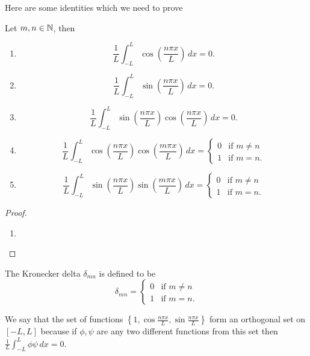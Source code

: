 \documentclass[10pt, a4paper]{article}
\begin{document}
Here are some identities which we need to prove
\begin{lemma}
    Let $m, n \in \mathbb{N}$,
    then
    \begin{enumerate}[label = \roman*)]
        \item
        \[
        \frac{1}{L}\int_{-L}^{L}\cos\left(\frac{n\pi x}{L}\right)\,dx = 0.
        \]
        \item
        \[
        \frac{1}{L}\int_{-L}^{L}\sin\left(\frac{n\pi x}{L}\right)\,dx = 0.
        \]
        \item
        \[
        \frac{1}{L}\int_{-L}^{L}\sin\left(\frac{n\pi x}{L}\right)\cos\left(\frac{n\pi x}{L}\right)\,dx = 0.
        \]
        \item
        \[
        \frac{1}{L}\int_{-L}^{L}\cos\left(\frac{n\pi x}{L}\right)\cos\left(\frac{m\pi x}{L}\right)\,dx = \begin{cases}
            0 & \text{if } m \neq n \\
            1 & \text{if } m = n.
        \end{cases}
        \]
        \item
        \[
        \frac{1}{L}\int_{-L}^{L}\sin\left(\frac{n\pi x}{L}\right)\sin\left(\frac{m\pi x}{L}\right)\,dx = \begin{cases}
            0 & \text{if } m \neq n \\
            1 & \text{if } m = n.
        \end{cases}
        \]
    \end{enumerate}
    \begin{proof}
        \begin{enumerate}[label = \roman*)]
            \item
        \end{enumerate}
    \end{proof}
\end{lemma}

The Kronecker delta $\delta_{mn}$ is defined to be
\[
\delta_{mn} = \begin{cases}
    0 & \text{if } m \neq n \\
    1 & \text{if } m = n.
\end{cases}
\]

We say that the set of functions $\left\{1, \cos{\frac{n\pi x}{L}}, \sin{\frac{n\pi x}{L}}\right\}$ form an orthogonal set on $[-L, L]$ because if $\phi, \psi$ are any two different functions from this set then $\frac{1}{L}\int_{-L}^{L}\phi\psi\,dx = 0$.
\end{document}
